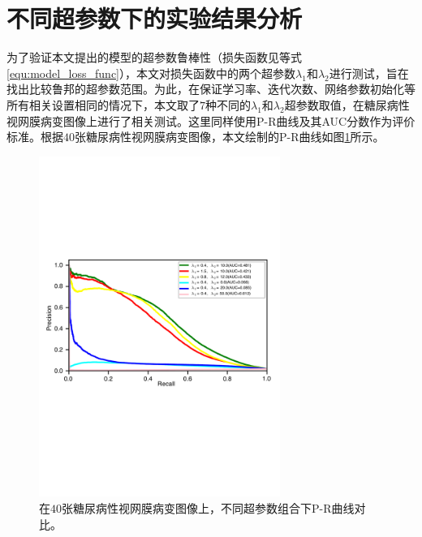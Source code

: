 
\section{不同超参数下的实验结果分析}\label{sec:hyper_paras}
为了验证本文提出的模型的超参数鲁棒性（损失函数见等式\ref{equ:model_loss_func}），本文对损失函数中的两个超参数$\lambda_{1}$和$\lambda_{2}$进行测试，旨在找出比较鲁邦的超参数范围。为此，在保证学习率、迭代次数、网络参数初始化等所有相关设置相同的情况下，本文取了$7$种不同的$\lambda_{1}$和$\lambda_{2}$超参数取值，在糖尿病性视网膜病变图像上进行了相关测试。这里同样使用P-R曲线及其AUC分数作为评价标准。根据$40$张糖尿病性视网膜病变图像，本文绘制的P-R曲线如图\ref{fig:pr_curve_retinal_hyper_paras}所示。
\begin{figure}[h]
	\centering
	\includegraphics[width=0.7\textwidth]{figure/pr_curve_retinal_hyper_paras/pr_curve.pdf}
	\caption[不同超参数组合下P-R曲线对比]{在$40$张糖尿病性视网膜病变图像上，不同超参数组合下P-R曲线对比。}
	\label{fig:pr_curve_retinal_hyper_paras}
\end{figure}


